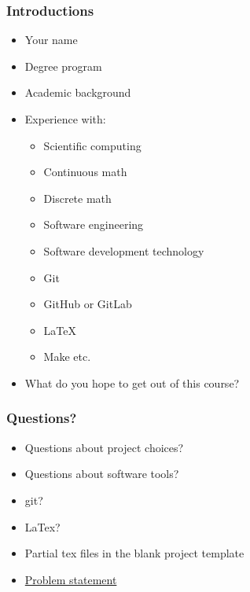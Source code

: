 \documentclass[t,12pt,numbers,fleqn]{beamer}
\begin{document}

\begin{frame}
\frametitle{Introductions}

\begin{itemize}
\item Your name
\item Degree program
\item Academic background
\item Experience with:
\begin{itemize}
\item Scientific computing
\item Continuous math
\item Discrete math
\item Software engineering
\item Software development technology
\bi
\item Git
\item GitHub or GitLab
\item LaTeX
\item Make etc.
\ei
\end{itemize}
\item What do you hope to get out of this course?
\end{itemize}

\end{frame}


\begin{frame}
\frametitle{Questions?}
\begin{itemize}
\item Questions about project choices?
\item Questions about software tools?
\bi
\item git?
\item LaTex?
\ei
\item Partial tex files in the blank project template
\item \href{https://gitlab.cas.mcmaster.ca/smiths/cas741/blob/master/BlankProjectTemplate/Doc/ProblemStatement/ProblemStatement.tex}{Problem statement}
\end{itemize}
\end{frame}

\end{document}
